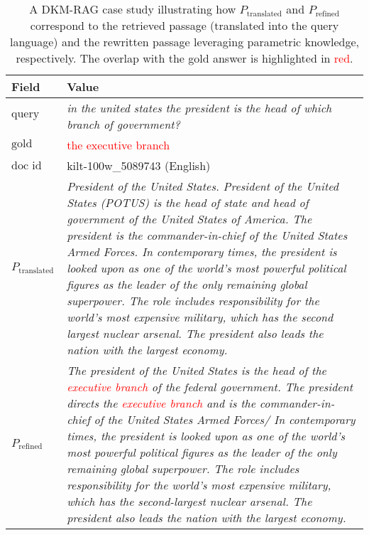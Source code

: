 \begin{table*}[ht]
\centering
\begin{tabularx}{\textwidth}{lX}
\hline
\textbf{Field} & \textbf{Value}\\
\hline
\(\displaystyle \text{query}\) & \textit{in the united states the president is the head of which branch of government?} \\
\hline
\(\displaystyle \text{gold answer}\) 
& \textcolor{red}{the executive branch} \\
\hline
\(\displaystyle \text{doc id}\) 
& kilt-100w\_5089743 (English)\\
\hline
\(\displaystyle P_{\text{translated}}\) 
& \textit{President of the United States. President of the United States (POTUS) 
is the head of state and head of government of the United States of America. 
The president is the commander-in-chief of the United States Armed Forces. 
In contemporary times, the president is looked upon as one of the world's 
most powerful political figures as the leader of the only remaining global superpower. The role includes responsibility for the world's most expensive military, which has the second largest nuclear arsenal. The president also leads the nation with the largest economy. } \\
\hline
\(\displaystyle P_{\text{refined}}\) 
& \textit{The president of the United States is the head of the 
\textcolor{red}{executive branch} of the federal government. 
The president directs the \textcolor{red}{executive branch} 
and is the commander-in-chief of the United States Armed Forces/ In contemporary times, the president is looked upon as one of the world's most powerful political figures as the leader of the only remaining global superpower. The role includes responsibility for the world's most expensive military, which has the second-largest nuclear arsenal. The president also leads the nation with the largest economy.} \\
\hline
\end{tabularx}
\caption{A DKM-RAG case study illustrating how \(\displaystyle P_{\text{translated}}\) and \(\displaystyle P_{\text{refined}}\) 
correspond to the retrieved passage (translated into the query language) and the rewritten passage leveraging parametric knowledge, respectively. The overlap with the gold answer is highlighted in \textcolor{red}{red}.}
\label{tab:case_dkm}
\end{table*}
